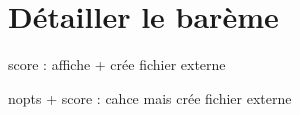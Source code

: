 \documentclass[12pt,a4paper]{scrartcl}
\begin{document}
\section{Détailler le barème} \label{exercises:score}

score : affiche + crée fichier externe

nopts + score : cahce mais crée fichier externe
\end{document}
